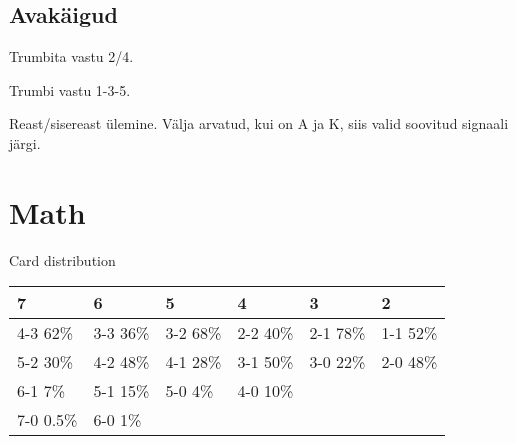 \documentclass[10pt]{article}
\begin{document}
\subsection{Avakäigud}
Trumbita vastu 2/4.

Trumbi vastu 1-3-5.

Reast/sisereast ülemine. Välja arvatud, kui on A ja K, siis valid soovitud signaali järgi.


\section{Math}

Card distribution
\begin{table}[h]
  \begin{tabular}[h]{l|l|l|l|l|l}
    7         & 6        & 5        & 4        & 3        & 2        \\
    \hline
    4-3 62\%  & 3-3 36\% & 3-2 68\% & 2-2 40\% & 2-1 78\% & 1-1 52\% \\
    5-2 30\%  & 4-2 48\% & 4-1 28\% & 3-1 50\% & 3-0 22\% & 2-0 48\% \\
    6-1 7\%   & 5-1 15\% & 5-0 4\%  & 4-0 10\% &                     \\
    7-0 0.5\% & 6-0 1\%  &                                           \\

  \end{tabular}
\end{table}

\end{document}
